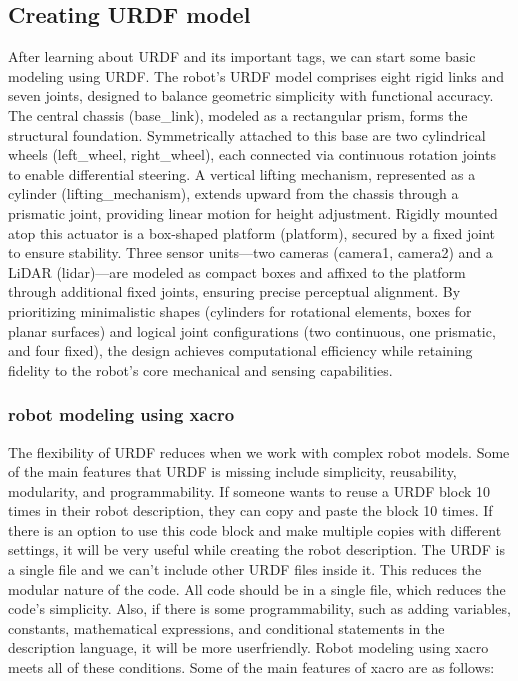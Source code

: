 \documentclass[../../main]{subfiles}
\begin{document}
\subsection{Creating URDF model}
After learning about URDF and its important tags, we can start some basic modeling
using URDF.
The robot’s URDF model comprises eight rigid links and seven joints,
designed to balance geometric simplicity with functional accuracy. 
The central chassis (base\_link), modeled as a rectangular prism, 
forms the structural foundation. 
Symmetrically attached to this base are two cylindrical wheels 
(left\_wheel, right\_wheel), each connected via continuous rotation 
joints to enable differential steering. A vertical lifting mechanism, 
represented as a cylinder (lifting\_mechanism), extends upward from the 
chassis through a prismatic joint, providing linear motion for height adjustment. 
Rigidly mounted atop this actuator is a box-shaped platform (platform), 
secured by a fixed joint to ensure stability. Three sensor units—two cameras 
(camera1, camera2) and a LiDAR (lidar)—are modeled as compact boxes and affixed 
to the platform through additional fixed joints, ensuring precise perceptual alignment. 
By prioritizing minimalistic shapes (cylinders for rotational elements, boxes for planar surfaces) 
and logical joint configurations (two continuous, one prismatic, and four fixed), the design achieves 
computational efficiency while retaining fidelity to the robot’s core mechanical and sensing capabilities.

\subsubsection{robot modeling using xacro}
The flexibility of URDF reduces when we work with complex robot models. Some of
the main features that URDF is missing include simplicity, reusability, modularity, and
programmability.
If someone wants to reuse a URDF block 10 times in their robot description, they can
copy and paste the block 10 times. If there is an option to use this code block and make
multiple copies with different settings, it will be very useful while creating the robot
description.
The URDF is a single file and we can't include other URDF files inside it. This reduces the
modular nature of the code. All code should be in a single file, which reduces the code's
simplicity.
Also, if there is some programmability, such as adding variables, constants, mathematical
expressions, and conditional statements in the description language, it will be more userfriendly.
Robot modeling using xacro meets all of these conditions. Some of the main features of
xacro are as follows:
\end{document}

